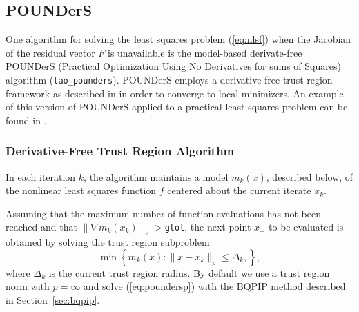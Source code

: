 \begin{comment}
Most solvers also require the Jacobian of this function.  
The routine that evaluates this matrix should be set
using the command {\tt Tao\-Set\-Jacobian\-Routine()}.

Using the constraint data provided by the user, the nonlinear
least squares solver formulates a minimization problem, and
solves the minimization problem using another TAO solver.  
A nonlinear least squares application should be solved with
the method \texttt{tao\_pounders} or \texttt{tao\_lm}.
\textbf{***** Jason, check the lm above. It would be great to include it
but otherwise say that we only have methods that do not use the Jacobian
and that if they have a Jacobian, they should use something else/the
next/beta version.}
\end{comment}

\subsection{POUNDerS}\label{sec:pounders}
One algorithm for solving the least squares problem (\ref{eq:nlsf}) when
the Jacobian of the residual vector $F$ is unavailable is the model-based
derivate-free POUNDerS (Practical Optimization Using No Derivatives for
sums of Squares) algorithm (\texttt{tao\_pounders}). 
POUNDerS employs a derivative-free trust region framework as described in
\cite{Dfobook} in order to converge to local minimizers. An example of
this version of POUNDerS applied to a
practical least squares problem can be found in \cite{UNEDF0}.



\subsubsection{Derivative-Free Trust Region Algorithm}
In each iteration $k$, the algorithm maintains a model $m_k(x)$,
described below, of the nonlinear least squares function $f$ centered about
the current iterate $x_k$. 

Assuming that the maximum number of function evaluations has not been
reached and that $\|\nabla m_k(x_k)\|_2>$\texttt{gtol}, the next point 
$x_+$ to be evaluated is obtained by solving the trust region subproblem 
\begin{equation}
 \min\left\{
 m_k(x) : 
 \|x-x_k\|_{p} \leq \Delta_k, 
 \right \}, 
 \label{eq:poundersp}
\end{equation}
where $\Delta_k$ is the current 
trust region radius. By default we use a trust region norm with $p=\infty$
and solve (\ref{eq:poundersp}) with the BQPIP method described in
Section~\ref{sec:bqpip}. 

